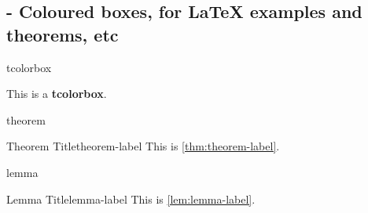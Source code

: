 
\subsection{ - Coloured boxes, for LaTeX examples and theorems, etc}

\begin{demo}{}{tcolorbox}
	\begin{tcolorbox}
		This is a \textbf{tcolorbox}.
	\end{tcolorbox}
\end{demo}

\begin{demo}{}{theorem}
	\begin{thm}{Theorem Title}{theorem-label}
		This is \cref{thm:theorem-label}.
	\end{thm}
\end{demo}

\begin{demo}{}{lemma}
	\begin{lem}{Lemma Title}{lemma-label}
		This is \cref{lem:lemma-label}.
	\end{lem}
\end{demo}
